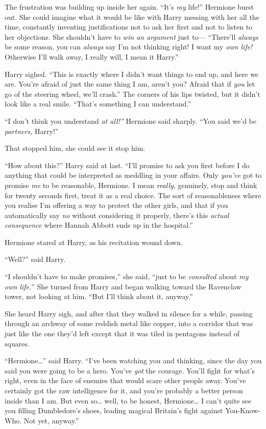 The frustration was building up inside her again. ``It's \emph{my}
life!'' Hermione burst out. She could imagine what it would be like with
Harry messing with her all the time, constantly inventing justifications
not to ask her first and not to listen to her objections. She shouldn't
have to \emph{win an argument} just to--- ``There'll \emph{always} be
some reason, you can \emph{always} say I'm not thinking right! I want my
\emph{own life!} Otherwise I'll walk away, I really will, I mean it
Harry.''

Harry sighed. ``This is exactly where I didn't want things to end up,
and here we are. You're afraid of just the same thing I am, aren't you?
Afraid that if \emph{you} let go of the steering wheel, we'll crash.''
The corners of his lips twisted, but it didn't look like a real smile.
``That's something I can understand.''

``I don't think you understand \emph{at all!''} Hermione said sharply.
``You said we'd be \emph{partners,} Harry!''

That stopped him, she could see it stop him.

``How about this?'' Harry said at last. ``I'll promise to ask you first
before I do anything that could be interpreted as meddling in your
affairs. Only \emph{you've} got to promise \emph{me} to be reasonable,
Hermione. I mean \emph{really}, genuinely, stop and think for twenty
seconds first, treat it as a real choice. The sort of reasonableness
where you realise I'm offering a way to protect the other girls, and
that if you automatically say \emph{no} without considering it properly,
there's this \emph{actual consequence} where Hannah Abbott ends up in
the hospital.''

Hermione stared at Harry, as his recitation wound down.

``Well?'' said Harry.

``I shouldn't have to make promises,'' she said, ``just to be
\emph{consulted} about \emph{my own life.}'' She turned from Harry and
began walking toward the Ravenclaw tower, not looking at him. ``But I'll
think about it, anyway.''

She heard Harry sigh, and after that they walked in silence for a while,
passing through an archway of some reddish metal like copper, into a
corridor that was just like the one they'd left except that it was tiled
in pentagons instead of squares.

``Hermione\ldots{}'' said Harry. ``I've been watching you and thinking,
since the day you said you were going to be a hero. You've \emph{got}
the courage. You'll fight for what's right, even in the face of enemies
that would scare other people away. You've certainly got the raw
intelligence for it, and you're probably a better person inside than I
am. But even so\ldots{} well, to be honest, Hermione\ldots{} I can't
quite see you filling Dumbledore's shoes, leading magical Britain's
fight against You-Know-Who. Not yet, anyway.''

